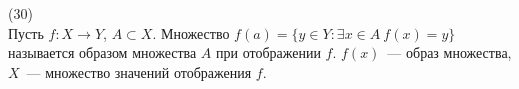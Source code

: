 (30)\\
Пусть $f: X \to Y$, $A \subset X$. Множество $f(a) = \{y \in Y: \exists x \in A\ f(x) = y\}$ называется образом множества $A$ при отображении $f$. $f(x)$~--- образ множества, $X$~--- множество значений отображения $f$.
